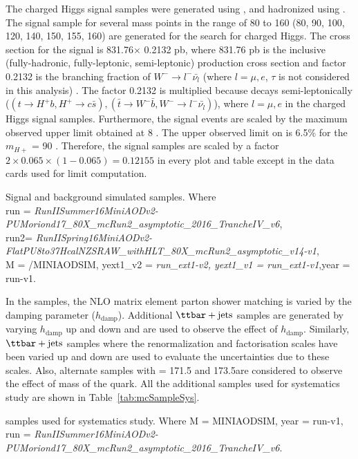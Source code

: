 The charged Higgs signal samples were generated using \MGvATNLO, and hadronized using \PYTHIA. The 
signal sample for several mass points in the range of 80 to 160 \GeV (80, 90, 100, 120, 140, 150, 
155, 160) are generated for the search for charged Higgs. The cross section 
for the signal is 831.76$\times$ 0.2132 pb, where 831.76 \unit{pb} is the inclusive 
(fully-hadronic, fully-leptonic, semi-leptonic) \ttjets production cross section and factor 
0.2132 is the branching fraction of $W^-\to l^- \bar{\nu_l}$ (where $l = \mu, e$, $\tau$ is not 
considered in this analysis) \cite{Beringer:1900zz}. The factor 0.2132 is multiplied because \ttbar decays 
semi-leptonically ($(t\to H^+ b, H^+\to c\bar{s}), (\bar{t}\to W^-\bar{b}, W^- \to l^-\bar{\nu_l})$), 
where $l = \mu, e$ in the charged Higgs signal samples. Furthermore, the signal events are scaled by 
the maximum observed upper limit obtained at 8 \TeV. The upper observed limit on \brThb is 6.5\% for
the $m_{H+}$ = 90 \GeV\cite{Khachatryan:2015uua}. Therefore, the signal samples are scaled by a factor 
$2\times 0.065\times (1-0.065) = 0.12155$ in every plot and table except in the data cards used for 
limit computation. 
\begin{table}
\caption{Signal and background simulated samples. Where \\  
\small{
run = { \em RunIISummer16MiniAODv2-PUMoriond17\_80X\_mcRun2\_asymptotic\_2016\_TrancheIV\_v6}, \\
run2= { \em RunIISpring16MiniAODv2-FlatPU8to37HcalNZSRAW\_withHLT\_80X\_mcRun2\_asymptotic\_v14-v1},\\
M = /MINIAODSIM, yext1\_v2 = { \em run\_ext1-v2, yext1\_v1 = run\_ext1-v1},year = run-v1.
}
}
\label{tab:mcSample}
\centering

\end{table}

In the \ttjets samples, the NLO matrix element parton shower matching is varied by the damping 
parameter ($h_\text{damp}$). Additional $\ttjets$ samples are generated by varying 
$h_\text{damp}$ up and down and are used to observe the effect of $h_\text{damp}$. Similarly, 
$\ttjets$ samples where the renormalization and factorisation scales have been varied up 
and down are used to evaluate the uncertainties due to these scales. Also, alternate \ttjets 
samples with \mt = 171.5 and 173.5\GeV are considered to observe the effect of mass of the \PQt quark. 
All the additional \ttjets samples used for systematics study are shown in Table~\ref{tab:mcSampleSys}. 
\begin{table}
    \caption{ \ttjets  samples used for systematics study. Where
M = \/MINIAODSIM, year = run-v1, \\
run = { \em RunIISummer16MiniAODv2-PUMoriond17\_80X\_mcRun2\_asymptotic\_2016\_TrancheIV\_v6}. 
}
\label{tab:mcSampleSys}
\centering

\end{table}


